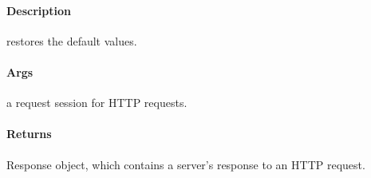 \documentclass[letterpaper,10pt,english]{sphinxmanual}
\begin{document}
\begin{fulllineitems}
\label{\detokenize{gemini_lidar_hub_API:gemini_lidar_hub_API.reset_lidar_hub_default_settings}}
\pysigstartsignatures
{}
\pysigstopsignatures

\paragraph{Description}
\label{\detokenize{gemini_lidar_hub_API:id41}}
\sphinxAtStartPar
restores the default values.


\paragraph{Args}
\label{\detokenize{gemini_lidar_hub_API:id42}}\begin{description}
\sphinxAtStartPar
a request session for HTTP requests.

\end{description}


\paragraph{Returns}
\label{\detokenize{gemini_lidar_hub_API:id43}}\begin{description}
\sphinxAtStartPar
Response object, which contains a server’s response to an HTTP request.

\end{description}

\end{fulllineitems}

\end{document}
